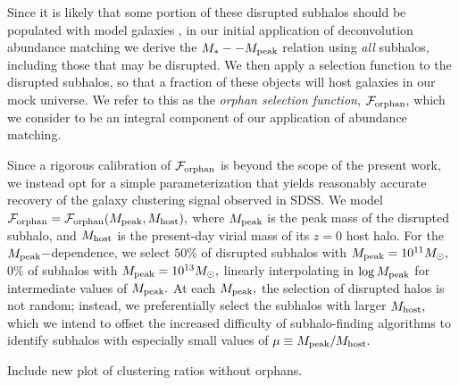 \documentclass[usenatbib,usegraphicx,letterpaper]{mn2e}
\newcommand{\mstar}{M_{\ast}}
\newcommand{\mpeak}{M_{\rm peak}}
\newcommand{\zpeak}{z_{M_{\rm peak}}}
\newcommand{\mhost}{M_{\rm host}}
\newcommand{\msun}{M_\odot}
\begin{document}
Since it is likely that some portion of these disrupted subhalos should be populated with model galaxies \citep{guo_white13, campbell_etal17}, in our initial application of deconvolution abundance matching we derive the $\mstar--\mpeak$ relation using {\em all} subhalos, including those that may be disrupted. We then apply a selection function to the disrupted subhalos, so that a fraction of these objects will host galaxies in our mock universe. We refer to this as the {\em orphan selection function}, $\mathcal{F}_{\rm orphan},$ which we consider to be an integral component of our application of abundance matching.

Since a rigorous calibration of $\mathcal{F}_{\rm orphan}$ is beyond the scope of the present work, we instead opt for a simple parameterization that yields reasonably accurate recovery of the galaxy clustering signal observed in SDSS. We model $\mathcal{F}_{\rm orphan}=\mathcal{F}_{\rm orphan}(M_{\rm peak},M_{\rm host}),$ where $\mpeak$ is the peak mass of the disrupted subhalo, and $\mhost$ is the present-day virial mass of its $z=0$ host halo. For the $\mpeak-$dependence, we select $50\%$ of disrupted subhalos with $\mpeak=10^{11}\msun,$ $0\%$ of subhalos with $\mpeak=10^{13}\msun,$ linearly interpolating in $\log\mpeak$ for intermediate values of $\mpeak.$ At each $\mpeak,$ the selection of disrupted halos is not random; instead, we preferentially select the subhalos with larger $\mhost,$ which we intend to offset the increased difficulty of subhalo-finding algorithms to identify subhalos with especially small values of  $\mu\equiv\mpeak/\mhost.$

{\color{blue} Include new plot of clustering ratios without orphans.}
\end{document}
